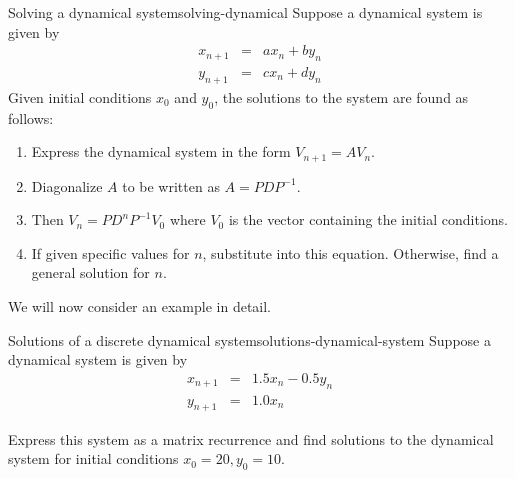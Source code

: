 \begin{procedure}{Solving a dynamical system}{solving-dynamical}
  Suppose a dynamical system is given by
  \begin{eqnarray*}
    x_{n+1} &=& a x_n + b y_n \\
    y_{n+1} &=& c x_n + d y_n
  \end{eqnarray*}
  Given initial conditions $x_0$ and $y_0$, the solutions to the
  system are found as follows:
  \begin{enumerate}
  \item Express the dynamical system in the form $V_{n+1} = AV_n$.
  \item Diagonalize $A$ to be written as $A = PDP^{-1}$.
  \item Then $V_{n} = PD^{n} P^{-1} V_{0}$ where $V_{0}$ is the vector
    containing the initial conditions.
  \item If given specific values for $n$, substitute into this
    equation. Otherwise, find a general solution for $n$.
  \end{enumerate}
\end{procedure}

We will now consider an example in detail.

\begin{example}{Solutions of a discrete dynamical system}{solutions-dynamical-system}
  Suppose a dynamical system is given by
  \begin{eqnarray*}
    x_{n+1} &=& 1.5 x_n - 0.5y_n\\
    y_{n+1} &=& 1.0 x_n
  \end{eqnarray*}

  Express this system as a matrix recurrence and find solutions to the
  dynamical system for initial conditions $x_0=20, y_0=10$.
\end{example}

